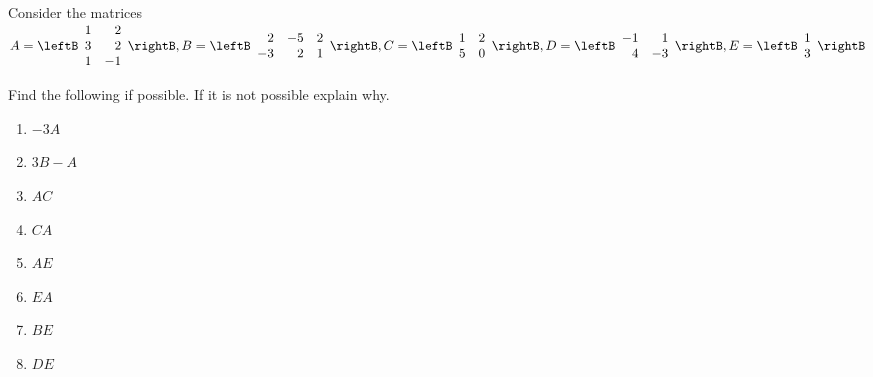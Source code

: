 \begin{enumialphparenastyle}
\begin{ex} Consider the matrices $
A =\leftB
\begin{array}{rr}
1 & 2 \\
3 & 2 \\
1 & -1
\end{array}
\rightB, B=\leftB
\begin{array}{rrr}
2 & -5 & 2 \\
-3 & 2 & 1
\end{array}
\rightB , 
C =\leftB
\begin{array}{rr}
1 & 2 \\
5 & 0
\end{array}
\rightB, \\ D=\leftB
\begin{array}{rr}
-1 & 1 \\
4 & -3
\end{array}
\rightB, E=\leftB
\begin{array}{r}
1 \\
3
\end{array}
\rightB$

Find the following if possible. If it is not possible explain
why. 
\begin{enumerate}  
\item $-3A$
\item $3B-A$
\item $AC$
\item $CA$
\item $AE$
\item $EA$
\item $BE$
\item $DE$
\end{enumerate}


\end{ex}
\end{enumialphparenastyle}
